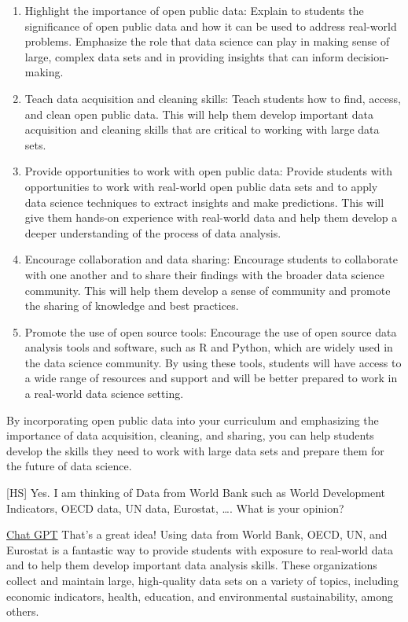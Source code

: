 \documentclass[
]{book}
\providecommand{\tightlist}{%
  \setlength{\itemsep}{0pt}\setlength{\parskip}{0pt}}
\theoremstyle{definition}
\theoremstyle{definition}
\theoremstyle{definition}
\theoremstyle{definition}
\theoremstyle{remark}
\begin{document}
\begin{enumerate}
\def\labelenumi{\arabic{enumi}.}
\tightlist
\item
  Highlight the importance of open public data: Explain to students the significance of open public data and how it can be used to address real-world problems. Emphasize the role that data science can play in making sense of large, complex data sets and in providing insights that can inform decision-making.
\item
  Teach data acquisition and cleaning skills: Teach students how to find, access, and clean open public data. This will help them develop important data acquisition and cleaning skills that are critical to working with large data sets.
\item
  Provide opportunities to work with open public data: Provide students with opportunities to work with real-world open public data sets and to apply data science techniques to extract insights and make predictions. This will give them hands-on experience with real-world data and help them develop a deeper understanding of the process of data analysis.
\item
  Encourage collaboration and data sharing: Encourage students to collaborate with one another and to share their findings with the broader data science community. This will help them develop a sense of community and promote the sharing of knowledge and best practices.
\item
  Promote the use of open source tools: Encourage the use of open source data analysis tools and software, such as R and Python, which are widely used in the data science community. By using these tools, students will have access to a wide range of resources and support and will be better prepared to work in a real-world data science setting.
\end{enumerate}

By incorporating open public data into your curriculum and emphasizing the importance of data acquisition, cleaning, and sharing, you can help students develop the skills they need to work with large data sets and prepare them for the future of data science.

{[}HS{]} Yes. I am thinking of Data from World Bank such as World Development Indicators, OECD data, UN data, Eurostat, \ldots. What is your opinion?

\protect\hyperlink{chatgpt}{Chat GPT} That's a great idea! Using data from World Bank, OECD, UN, and Eurostat is a fantastic way to provide students with exposure to real-world data and to help them develop important data analysis skills. These organizations collect and maintain large, high-quality data sets on a variety of topics, including economic indicators, health, education, and environmental sustainability, among others.
\end{document}
